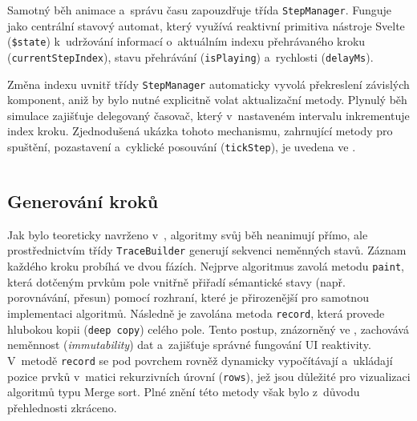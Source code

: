 Samotný běh animace a~správu času zapouzdřuje třída \texttt{StepManager}.
Funguje jako centrální stavový automat, který využívá reaktivní primitiva nástroje Svelte (\texttt{\$state}) k~udržování informací o~aktuálním indexu přehrávaného kroku (\texttt{currentStepIndex}), stavu přehrávání (\texttt{isPlaying}) a~rychlosti (\texttt{delayMs}).

Změna indexu uvnitř třídy \texttt{StepManager} automaticky vyvolá překreslení závislých komponent, aniž by bylo nutné explicitně volat aktualizační metody.
Plynulý běh simulace zajišťuje delegovaný časovač, který v~nastaveném intervalu inkrementuje index kroku.
Zjednodušená ukázka tohoto mechanismu, zahrnující metody pro spuštění, pozastavení a~cyklické posouvání (\texttt{tickStep}), je uvedena ve .

\begin{listing}[ht]
    \inputminted{typescript}{code/implementation/stepManager.ts}
    \caption{Zjednodušená implementace časovače a~stavů ve třídě StepManager}
    \label{code:step_manager}
\end{listing}

\subsection{Generování kroků}
\label{subsec:trace-generation}

Jak bylo teoreticky navrženo v~, algoritmy svůj běh neanimují přímo, ale prostřednictvím třídy \texttt{TraceBuilder} generují sekvenci neměnných stavů.
Záznam každého kroku probíhá ve dvou fázích.
Nejprve algoritmus zavolá metodu \texttt{paint}, která dotčeným prvkům pole vnitřně přiřadí sémantické stavy (např.
porovnávání, přesun) pomocí rozhraní, které je přirozenější pro samotnou implementaci algoritmů.
Následně je zavolána metoda \texttt{record}, která provede hlubokou kopii (\texttt{deep copy}) celého pole.
Tento postup, znázorněný ve , zachovává neměnnost (\textit{immutability}) dat a~zajišťuje správné fungování UI reaktivity.
V~metodě \texttt{record} se pod povrchem rovněž dynamicky vypočítávají a~ukládají pozice prvků v~matici rekurzivních úrovní (\texttt{rows}), jež jsou důležité pro vizualizaci algoritmů typu Merge sort.
Plné znění této metody však bylo z~důvodu přehlednosti zkráceno.

\begin{listing}[ht]
    \inputminted{typescript}{code/implementation/traceBuilder.ts}
    \caption{Implementace metod paint a~record ve třídě DetailedTraceBuilder}
    \label{code:trace_builder}
\end{listing}

